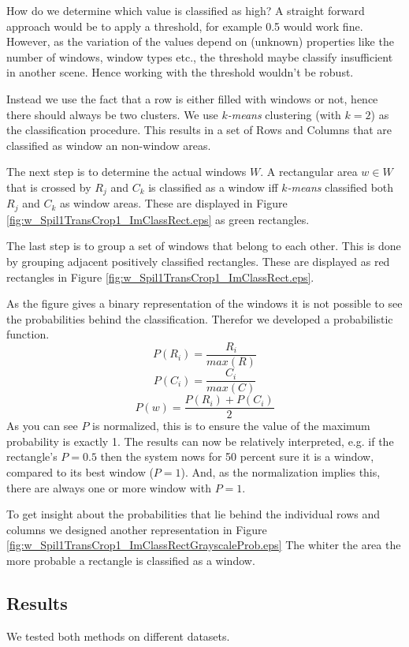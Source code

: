 How do we determine which value is classified as high?  A straight forward
approach would be to apply a threshold, for example 0.5 would work fine.
However, as the variation of the values depend on (unknown) properties like the
number of windows, window types etc., the threshold maybe classify insufficient
in another scene.  Hence working with the threshold wouldn't be robust. 

Instead we use the fact that a row is either filled with windows or not, hence
there should always be two clusters.  We use \emph{$k$-means} clustering (with
$k=2$) as the classification procedure.
This results in a set of Rows and Columns that are classified as window an
non-window areas.

The next step is to determine the actual windows $W$.
A rectangular area $w\in W$ that is crossed by $R_j$ and $C_k$ is classified as a
window iff \emph{$k$-means} classified both $R_j$ and $C_k$ as window areas. These are displayed in 
 Figure \ref{fig:w_Spil1TransCrop1_ImClassRect.eps} as green rectangles.

The last step is to group a set of windows that belong to each other. This is done by 
grouping adjacent positively classified rectangles. These are displayed as red
rectangles in Figure \ref{fig:w_Spil1TransCrop1_ImClassRect.eps}.

As the figure gives a binary representation of the windows it is not possible
to see the probabilities behind the classification.
Therefor we developed a probabilistic function. 
\[P(R_i) = \frac{R_i}{max(R)}\]
\[P(C_i) = \frac{C_i}{max(C)}\]
\[P(w) = \frac{P(R_i) + P(C_i)}{2}\]
As you can see $P$ is normalized, this is to ensure the value of the maximum
probability is exactly 1. The results can now be relatively interpreted, e.g. if the rectangle's $P=0.5$
then the system nows for 50 percent sure it is a window, compared to its best window ($P=1$). 
And, as the normalization implies this, there are always one or more window with $P=1$. 

To get insight about the probabilities that lie behind the individual rows and columns
we designed another representation in Figure \ref{fig:w_Spil1TransCrop1_ImClassRectGrayscaleProb.eps}
The whiter the area the more probable a rectangle is classified as a window.



\subsection{Results}
We tested both methods on different datasets.

